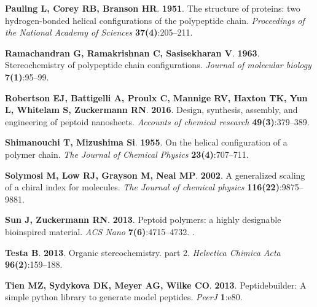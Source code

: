 \documentclass[fleqn,10pt,lineno]{wlpeerj} %
\begin{document}
\begin{thebibliography}{58}
\textbf{Pauling L, Corey RB, Branson HR}. \textbf{1951}.
\newblock The structure of proteins: two hydrogen-bonded helical configurations
  of the polypeptide chain.
\newblock \emph{Proceedings of the National Academy of Sciences}
  \textbf{37(4)}:205--211.

\textbf{Ramachandran G, Ramakrishnan C, Sasisekharan V}. \textbf{1963}.
\newblock Stereochemistry of polypeptide chain configurations.
\newblock \emph{Journal of molecular biology} \textbf{7(1)}:95--99.

\textbf{Robertson EJ, Battigelli A, Proulx C, Mannige RV, Haxton TK, Yun L,
  Whitelam S, Zuckermann RN}. \textbf{2016}.
\newblock Design, synthesis, assembly, and engineering of peptoid nanosheets.
\newblock \emph{Accounts of chemical research} \textbf{49(3)}:379--389.

\textbf{Shimanouchi T, Mizushima Si}. \textbf{1955}.
\newblock On the helical configuration of a polymer chain.
\newblock \emph{The Journal of Chemical Physics} \textbf{23(4)}:707--711.

\textbf{Solymosi M, Low RJ, Grayson M, Neal MP}. \textbf{2002}.
\newblock A generalized scaling of a chiral index for molecules.
\newblock \emph{The Journal of chemical physics} \textbf{116(22)}:9875--9881.

\textbf{Sun J, Zuckermann RN}. \textbf{2013}.
\newblock Peptoid polymers: a highly designable bioinspired material.
\newblock \emph{ACS Nano} \textbf{7(6)}:4715--4732.
\newblock {}.

\textbf{Testa B}. \textbf{2013}.
\newblock Organic stereochemistry. part 2.
\newblock \emph{Helvetica Chimica Acta} \textbf{96(2)}:159--188.

\textbf{Tien MZ, Sydykova DK, Meyer AG, Wilke CO}. \textbf{2013}.
\newblock Peptidebuilder: A simple python library to generate model peptides.
\newblock \emph{PeerJ} \textbf{1}:e80.


\end{thebibliography}
\end{document}
